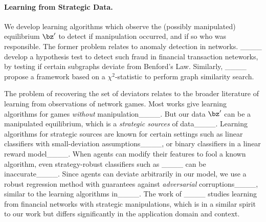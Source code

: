 \paragraph{Learning from Strategic Data.} We develop learning algorithms which observe the (possibly manipulated) equilibrium $\bz^\prime$ to detect if manipulation occurred, and if so who was responsible. The former problem relates to anomaly detection in networks. ____ develop a hypothesis test to detect such fraud in financial transaction neteworks, by testing if certain subgraphs deviate from Benford's Law. Similarly, ____ propose a framework based on a $\chi^2$-statistic to perform graph similarity search. 

The problem of recovering the set of deviators relates to the broader literature of learning from observations of network games. Most works give learning algorithms for games {\em without} manipulation____. But our data $\bz^\prime$ can be a manipulated equilibrium, which is a {\em strategic sources} of data____. Learning algorithms for strategic sources are known for certain settings such as linear classifiers with small-deviation assumptions____, or binary classifiers in a linear reward model____. When agents can modify their features to fool a known algorithm, even strategy-robust classifiers such as ____ can be inaccurate____.  
Since agents can deviate arbitrarily in our model, we use a robust regression method with guarantees against {\em adversarial} corruptions____, similar to the learning algorithms in____. The work of ____ studies learning from financial networks with strategic manipulations, which is in a similar spirit to our work but differs significantly in the application domain and context. 




